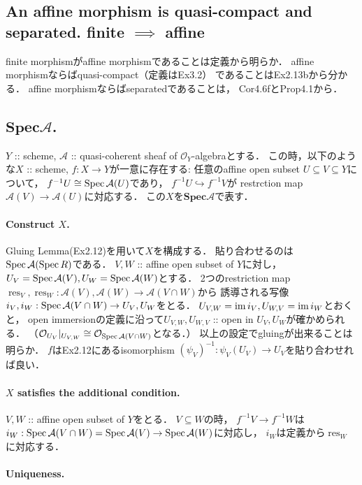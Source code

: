 \documentclass[a4paper]{jsarticle}
\newcommand{\shA}{\mathcal{A}}
\newcommand{\shO}{\mathcal{O}}
\newcommand{\res}{\operatorname{res}}
\newcommand{\bfSpec}{\mathbf{Spec}}
\begin{document}
    \subsection{An affine morphism is quasi-compact and separated. finite $\implies$ affine}
    finite morphismがaffine morphismであることは定義から明らか．
    affine morphismならばquasi-compact（定義はEx3.2）
    であることはEx2.13bから分かる．
    affine morphismならばseparatedであることは，
    Cor4.6fとProp4.1から．
    
    \subsection{$\bfSpec \shA$.}
    $Y$ :: scheme, $\shA$ :: quasi-coherent sheaf of $\shO_Y$-algebraとする．
    この時，以下のような$X$ :: scheme, $f : X \to Y$が一意に存在する:
    任意のaffine open subset $U \subseteq V \subseteq Y$について，
    $f^{-1}U \iso \Spec \shA(U)$であり，
    $f^{-1}U \hookrightarrow f^{-1}V$が
    restrction map $\shA(V) \to \shA(U)$に対応する．
    この$X$を$\bfSpec \shA$で表す．

    \paragraph{Construct $X$.}
    Gluing Lemma(Ex2.12)を用いて$X$を構成する．
    貼り合わせるのは$\Spec \shA(\Spec R)$である．
    $V, W$ :: affine open subset of $Y$に対し，
    $U_{V}=\Spec \shA(V), U_{W}=\Spec \shA(W)$とする．
    2つのrestriction map $\res_V, \res_W: \shA(V), \shA(W) \to \shA(V \cap W)$から
    誘導される写像$i_V, i_W: \Spec \shA(V \cap W) \to U_V, U_W$をとる．
    $U_{V,W}=\operatorname{im} i_V, U_{W,V}=\operatorname{im} i_W$とおくと，
    open immersionの定義に沿って$U_{V,W}, U_{W,V}$ :: open in $U_V, U_W$が確かめられる．
    （$\shO_{U_V}|_{U_{V,W}} \iso \shO_{\Spec \shA(V \cap W)}$となる．）
    以上の設定でgluingが出来ることは明らか．
    $f$はEx2.12にあるisomorphism $(\psi_V)^{-1}: \psi_V(U_V) \to U_V$を貼り合わせれば良い．

    \paragraph{$X$ satisfies the additional condition.}
    $V, W$ :: affine open subset of $Y$をとる．
    $V \subseteq W$の時，
    $f^{-1}V \to f^{-1}W$は$i_W: \Spec \shA(V \cap W)=\Spec \shA(V) \to \Spec \shA(W)$に対応し，
    $i_W$は定義から$\res_W$に対応する．

    \paragraph{Uniqueness.}
\end{document}
